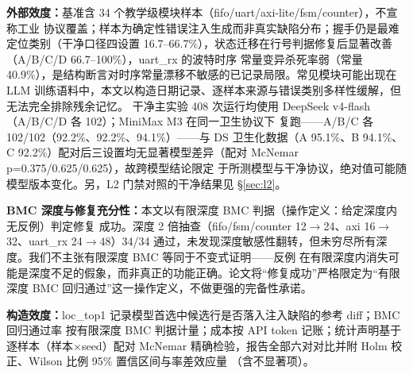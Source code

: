 \documentclass[twocolumn,10pt]{ctexart}
\begin{document}
\textbf{外部效度：}基准含 34 个教学级模块样本（fifo/uart/axi-lite/fsm/counter），不宣称工业
协议覆盖；样本为确定性错误注入生成而非真实缺陷分布；握手仍是最难定位类别（干净口径四设置
16.7--66.7\%），状态迁移在行号判据修复后显著改善（A/B/C/D 66.7--100\%），uart\_rx 的波特时序
常量变异杀死率弱（常量 40.9\%），是结构断言对时序常量漂移不敏感的已记录局限。常见模块可能出现在
LLM 训练语料中，本文以构造日期记录、逐样本来源与错误类别多样性缓解，但无法完全排除残余记忆。
干净主实验 408 次运行均使用 DeepSeek v4-flash（A/B/C/D 各 102）；MiniMax M3 在同一卫生协议下
复跑——A/B/C 各 102/102（92.2\%、92.2\%、94.1\%）——与 DS 卫生化数据（A 95.1\%、B 94.1\%、
C 92.2\%）配对后三设置均无显著模型差异（配对 McNemar p=0.375/0.625/0.625），故跨模型结论限定
于所测模型与干净协议，绝对值可能随模型版本变化。另，L2 门禁对照的干净结果见 \S\ref{sec:l2}。

\textbf{BMC 深度与修复充分性：}本文以有限深度 BMC 判据（操作定义：给定深度内无反例）判定修复
成功。深度 2 倍抽查（fifo/fsm/counter 12$\to$24、axi 16$\to$32、uart\_rx 24$\to$48）34/34
通过，未发现深度敏感性翻转，但未穷尽所有深度。我们不主张有限深度 BMC 等同于不变式证明——反例
在有限深度内消失可能是深度不足的假象，而非真正的功能正确。论文将“修复成功”严格限定为“有限深度
BMC 回归通过”这一操作定义，不做更强的完备性承诺。

\textbf{构造效度：}loc\_top1 记录模型首选中候选行是否落入注入缺陷的参考 diff；BMC 回归通过率
按有限深度 BMC 判据计量；成本按 API token 记账；统计声明基于逐样本（样本$\times$seed）配对
McNemar 精确检验，报告全部六对对比并附 Holm 校正、Wilson 比例 95\% 置信区间与率差效应量
（含不显著项）。
\end{document}
